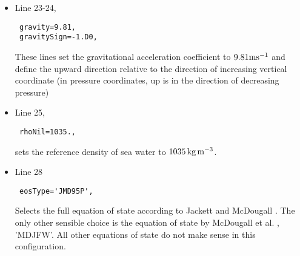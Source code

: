 {\begin{itemize}
\item Line 23-24,
\begin{verbatim}
 gravity=9.81,
 gravitySign=-1.D0,
\end{verbatim}
  These lines set the gravitational acceleration coefficient to
  $9.81{\rm m}{\rm s}^{-1}$ and define the upward direction relative
  to the direction of increasing vertical coordinate (in pressure
  coordinates, up is in the direction of decreasing pressure)
\item Line 25,
\begin{verbatim}
 rhoNil=1035.,
\end{verbatim}
  sets the reference density of sea water to $1035\mbox{\,kg\,m$^{-3}$}$.\\

\item Line 28
\begin{verbatim}
 eosType='JMD95P',
\end{verbatim}
  Selects the full equation of state according to Jackett and McDougall
  \cite{jackett95}. The only other sensible choice is the equation of
  state by McDougall et al. \cite{mcdougall03}, 'MDJFW'. All other
  equations of state do not make sense in this configuration.\\


\end{itemize}}
